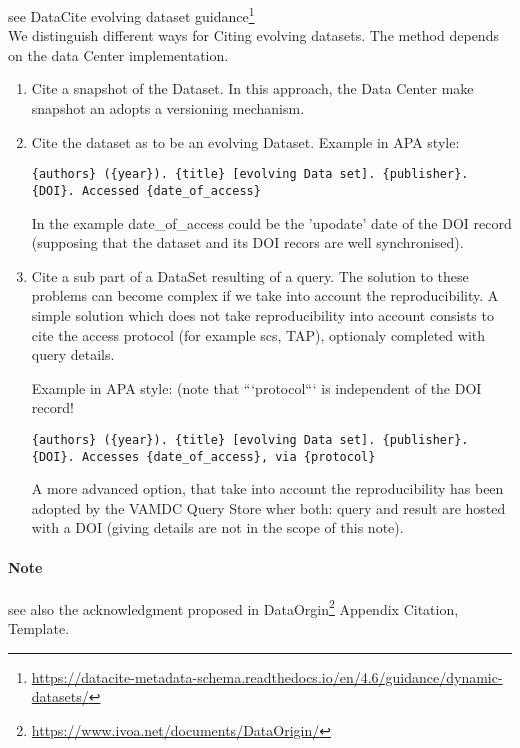 \documentclass[11pt,a4paper]{ivoa}
\begin{document}
see DataCite evolving dataset guidance\footnote{\url{https://datacite-metadata-schema.readthedocs.io/en/4.6/guidance/dynamic-datasets/}}\\

We distinguish different ways for Citing evolving datasets. The method depends on the data Center implementation.

\begin{enumerate}
  \item Cite a snapshot of the Dataset. In this approach, the Data Center make snapshot an adopts a versioning mechanism.
  \item  Cite the dataset as to be an evolving Dataset.
         Example in APA style:\\
\begin{verbatim}
{authors} ({year}). {title} [evolving Data set]. {publisher}.
{DOI}. Accessed {date_of_access}
\end{verbatim}

		In the example {date\_of\_access} could be the 'upodate' date of the DOI record (supposing that the dataset and its DOI recors are well synchronised).

	\item Cite a sub part of a DataSet resulting of a query. 
	The solution to these problems can become complex if we take into account the reproducibility.
	A simple solution which does not take reproducibility into account consists to cite the access protocol (for example scs, TAP), optionaly completed with query details.

	Example in APA style: (note that ```protocol``` is independent of the DOI record!
\begin{verbatim}
{authors} ({year}). {title} [evolving Data set]. {publisher}. 
{DOI}. Accesses {date_of_access}, via {protocol}	
\end{verbatim}

	A more advanced option, that take into account the reproducibility has been adopted by the VAMDC Query Store wher both: query and result are hosted with a DOI (giving details are not in the scope of this note).
\end{enumerate}

\paragraph{Note} see also the acknowledgment proposed in DataOrgin\footnote{\url{https://www.ivoa.net/documents/DataOrigin/}} Appendix Citation, Template.
\end{document}
